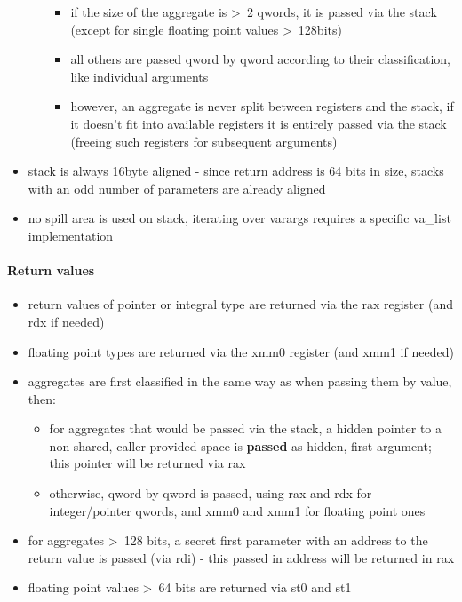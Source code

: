 \begin{itemize}
\begin{itemize}
\begin{itemize}
    \item if the size of the aggregate is \textgreater\ 2 qwords, it is passed via the stack (except for single floating point values \textgreater\ 128bits)
    \item all others are passed qword by qword according to their classification, like individual arguments
	\item however, an aggregate is never split between registers and the stack, if it doesn't fit into available registers it is entirely passed via the stack (freeing such registers for subsequent arguments)
  \end{itemize}
\end{itemize}
\item stack is always 16byte aligned - since return address is 64 bits in size, stacks with an odd number of parameters are
already aligned
\item no spill area is used on stack, iterating over varargs requires a specific va\_list implementation
\end{itemize}


\paragraph{Return values}

\begin{itemize}
\item return values of pointer or integral type are returned via the rax register (and rdx if needed)
\item floating point types are returned via the xmm0 register (and xmm1 if needed)
\item aggregates are first classified in the same way as when passing them by value, then:
\begin{itemize}
  \item for aggregates that would be passed via the stack, a hidden pointer to a non-shared, caller provided space is {\bf passed} as hidden, first argument; this pointer will be returned via rax
  \item otherwise, qword by qword is passed, using rax and rdx for integer/pointer qwords, and xmm0 and xmm1 for floating point ones
\end{itemize}
\item for aggregates \textgreater\ 128 bits, a secret first parameter with an address to the return value is
passed (via rdi) - this passed in address will be returned in rax
\item floating point values \textgreater\ 64 bits are returned via st0 and st1
\end{itemize}


